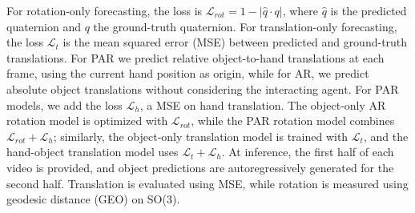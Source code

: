 For rotation-only forecasting, the loss is \(\mathscr{L}_{rot} = 1 - |\hat{q} \cdot q|\), where \(\hat{q}\) is the predicted quaternion and \(q\) the ground-truth quaternion. For translation-only forecasting, the loss \(\mathscr{L}_t\) is the mean squared error (MSE) between predicted and ground-truth translations. For PAR we predict relative object-to-hand translations at each frame, using the current hand position as origin, while for AR, we predict absolute object translations without considering the interacting agent. 
For PAR models, we add the loss \(\mathscr{L}_h\), a MSE on hand translation. The object-only AR rotation model is optimized with \(\mathscr{L}_{rot}\), while the PAR rotation model combines \(\mathscr{L}_{rot} + \mathscr{L}_h\); similarly, the object-only translation model is trained with \(\mathscr{L}_t\), and the hand-object translation model uses \(\mathscr{L}_t + \mathscr{L}_h\). 
At inference, the first half of each video is provided, and object predictions are autoregressively generated for the second half. Translation is evaluated using MSE, while rotation is measured using geodesic distance (GEO) on SO(3).





